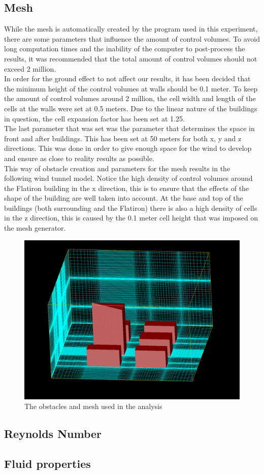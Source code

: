 \subsection{Mesh}
\label{sec:mesh}
While the mesh is automatically created by the program used in this experiment, there are some parameters that influence the amount of control volumes. To avoid long computation times and the inability of the computer to post-process the results, it was recommended that the total amount of control volumes should not exceed 2 million. \\
\indent %
In order for the ground effect to not affect our results, it has been decided that the minimum height of the control volumes at walls should be 0.1 meter. To keep the amount of control volumes around 2 million, the cell width and length of the cells at the walls were set at 0.5 meters. Due to the linear nature of the buildings in question, the cell expansion factor has been set at 1.25. \\
\indent %
The last parameter that was set was the parameter that determines the space in front and after buildings. This has been set at 50 meters for both x, y and z directions. This was done in order to give enough space for the wind to develop and ensure as close to reality results as possible. \\
\indent %
This way of obstacle creation and parameters for the mesh results in the following wind tunnel model. Notice the high density of control volumes around the Flatiron building in the x direction, this is to ensure that the effects of the shape of the building are well taken into account. At the base and top of the buildings (both surrounding and the Flatiron) there is also a high density of cells in the z direction, this is caused by the 0.1 meter cell height that was imposed on the mesh generator. 
\begin{figure}[ht!]
\centering
\includegraphics[width = \textwidth]{mesh.png}
\caption{The obstacles and mesh used in the analysis}
\label{fig:mesh}
\end{figure}
\subsection{Reynolds Number}
\subsection{Fluid properties}